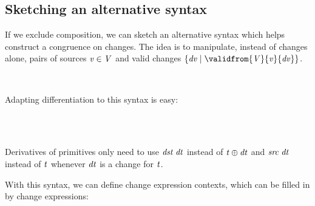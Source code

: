 \subsection{Sketching an alternative syntax}
If we exclude composition, we can sketch an alternative syntax
which helps construct a congruence on changes.
The idea is to manipulate, instead of changes alone, pairs of
sources \ensuremath{\Varid{v}\in \Conid{V}} and valid changes $\{\ensuremath{\Varid{dv}\mid\validfrom{\Conid{V}}{\Varid{v}}{\Varid{dv}}}\}$.
\begin{hscode}\SaveRestoreHook
{}%
%
%
\>[3]{}\mathbin{::=}\;\mid {}\;\mid {}\mid {}\;\mid \lambda {}\to {}\<[E]%
\\
\>[3]{}\mathbin{::=}\;\mid {}\;\mid \lambda {}\to {}\mid {}\<[E]%
\ColumnHook
\end{hscode}\resethooks
Adapting differentiation to this syntax is easy:
\begin{hscode}\SaveRestoreHook
{}%
%
%
\>[3]{}\mathrel{=}\<[E]%
\\
\>[3]{}\mathrel{=}\;\<[E]%
\\
\>[3]{}\mathrel{=}\<[E]%
\ColumnHook
\end{hscode}\resethooks
Derivatives of
primitives only need to use \ensuremath{\Varid{dst}\;\Varid{dt}} instead of \ensuremath{\Varid{t}\oplus \Varid{dt}}
and \ensuremath{\Varid{src}\;\Varid{dt}} instead of \ensuremath{\Varid{t}} whenever \ensuremath{\Varid{dt}} is a change for \ensuremath{\Varid{t}}.

With this syntax, we can define change expression contexts, which
can be filled in by change expressions:

\begin{hscode}\SaveRestoreHook
{}%
%
%
\>[3]{}\mathbin{::=}\;\mid {}\;\mid {}\;\mid {}\;\mid \lambda {}\to {}\<[E]%
\\
\>[3]{}\mathbin{::=}\;\mid {}\;\mid \lambda {}\to {}\<[E]%
\ColumnHook
\end{hscode}\resethooks

